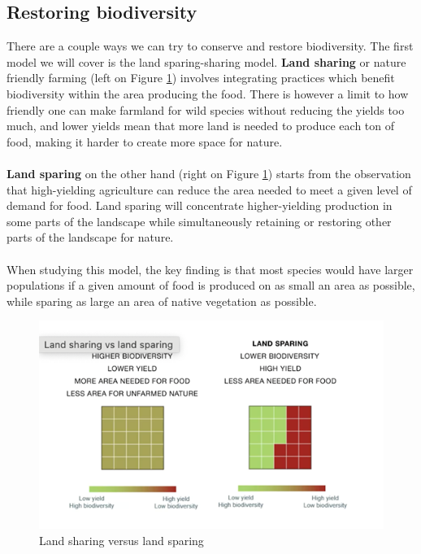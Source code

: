 \documentclass[../summary.tex]{subfiles}
\begin{document}
	\subsection{Restoring biodiversity}
	There are a couple ways we can try to conserve and restore biodiversity. The first model we will cover is the land sparing-sharing model. \textbf{Land sharing} or nature friendly farming (left on Figure \ref{fig:land-sharing-sparing}) involves integrating practices which benefit biodiversity within the area producing the food. There is however a limit to how friendly one can make farmland for wild species without reducing the yields too much, and lower yields mean that more land is needed to produce each ton of food, making it harder to create more space for nature.
	\\
	\\
	\textbf{Land sparing} on the other hand (right on Figure \ref{fig:land-sharing-sparing}) starts from the observation that high-yielding agriculture can reduce the area needed to meet a given level of demand for food. Land sparing will concentrate higher-yielding production in some parts of the landscape while simultaneously retaining or restoring other parts of the landscape for nature.
	\\
	\\
	When studying this model, the key finding is that most species would have larger populations if a given amount of food is produced on as small an area as possible, while sparing as large an area of native vegetation as possible. 
	\\
	\begin{figure}[htbp]
		\centering
		\includegraphics[width=1\linewidth]{images/2-land-sharing-sparing.png}
		\caption{Land sharing versus land sparing}
		\label{fig:land-sharing-sparing}
	\end{figure}
\end{document}

